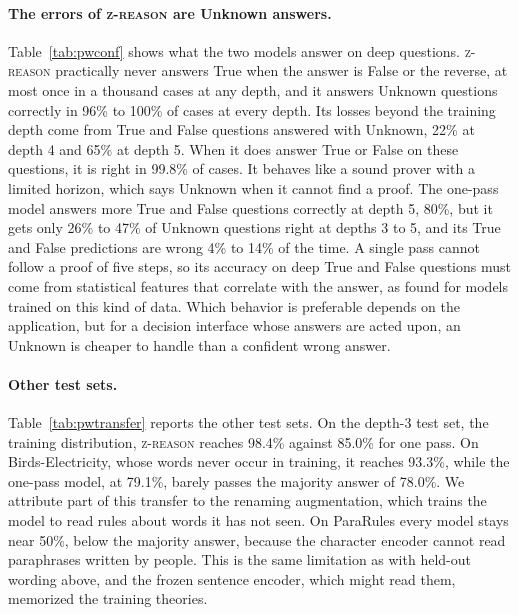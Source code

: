 \documentclass{article}
\newcommand{\zr}{\textsc{z-reason}}
\begin{document}
\paragraph{The errors of \zr{} are Unknown answers.} Table~\ref{tab:pwconf} shows what the two models answer on deep questions. \zr{} practically never answers True when the answer is False or the reverse, at most once in a thousand cases at any depth, and it answers Unknown questions correctly in 96\% to 100\% of cases at every depth. Its losses beyond the training depth come from True and False questions answered with Unknown, 22\% at depth 4 and 65\% at depth 5. When it does answer True or False on these questions, it is right in 99.8\% of cases. It behaves like a sound prover with a limited horizon, which says Unknown when it cannot find a proof. The one-pass model answers more True and False questions correctly at depth 5, 80\%, but it gets only 26\% to 47\% of Unknown questions right at depths 3 to 5, and its True and False predictions are wrong 4\% to 14\% of the time. A single pass cannot follow a proof of five steps, so its accuracy on deep True and False questions must come from statistical features that correlate with the answer, as \cite{zhang2023paradox} found for models trained on this kind of data. Which behavior is preferable depends on the application, but for a decision interface whose answers are acted upon, an Unknown is cheaper to handle than a confident wrong answer.

\begin{table}[t]
\centering
\small
\caption{ProofWriter accuracy in percent over all questions of each test set, mean $\pm$ standard deviation over three seeds for \zr{} and one seed for the baselines. Birds-Electricity uses a vocabulary never seen in training and ParaRules contains human paraphrases of the theories.}
\label{tab:pwtransfer}

\end{table}

\paragraph{Other test sets.} Table~\ref{tab:pwtransfer} reports the other test sets. On the depth-3 test set, the training distribution, \zr{} reaches 98.4\% against 85.0\% for one pass. On Birds-Electricity, whose words never occur in training, it reaches 93.3\%, while the one-pass model, at 79.1\%, barely passes the majority answer of 78.0\%. We attribute part of this transfer to the renaming augmentation, which trains the model to read rules about words it has not seen. On ParaRules every model stays near 50\%, below the majority answer, because the character encoder cannot read paraphrases written by people. This is the same limitation as with held-out wording above, and the frozen sentence encoder, which might read them, memorized the training theories.
\end{document}
